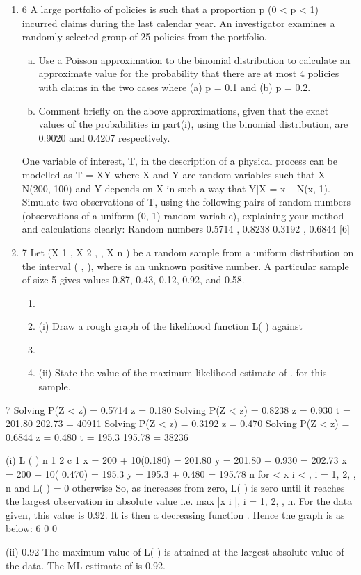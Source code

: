 \documentclass[a4paper,12pt]{article}
\begin{document}
\begin{enumerate}

\item 6
A large portfolio of policies is such that a proportion p (0 < p < 1) incurred claims
during the last calendar year. An investigator examines a randomly selected group of
25 policies from the portfolio.

\begin{enumerate}[(a)]
\item Use a Poisson approximation to the binomial distribution to calculate an
approximate value for the probability that there are at most 4 policies with
claims in the two cases where (a) p = 0.1 and (b) p = 0.2.
\item Comment briefly on the above approximations, given that the exact values of
the probabilities in part(i), using the binomial distribution, are 0.9020 and
0.4207 respectively.
\end{enumerate}

One variable of interest, T, in the description of a physical process can be modelled as
T = XY where X and Y are random variables such that X ~ N(200, 100) and Y depends
on X in such a way that Y|X = x ~ N(x, 1).
Simulate two observations of T, using the following pairs of random numbers
(observations of a uniform (0, 1) random variable), explaining your method and
calculations clearly:
Random numbers
0.5714 , 0.8238
0.3192 , 0.6844
[6]
\item 7
Let (X 1 , X 2 , , X n ) be a random sample from a uniform distribution on the interval
( , ), where is an unknown positive number.
A particular sample of size 5 gives values 0.87, 0.43, 0.12, 0.92, and 0.58.
\begin{enumerate}
\item \item (i) Draw a rough graph of the likelihood function L( ) against
\item \item (ii) State the value of the maximum likelihood estimate of . for this sample.
\end{enumerate}
\end{enumerate}




7
Solving P(Z < z) = 0.5714 z = 0.180
Solving P(Z < z) = 0.8238 z = 0.930
t = 201.80 202.73 = 40911
Solving P(Z < z) = 0.3192 z = 0.470
Solving P(Z < z) = 0.6844 z = 0.480
t = 195.3 195.78 = 38236
\item (i)
L ( )
n
1
2
c
1
x = 200 + 10(0.180) = 201.80
y = 201.80 + 0.930 = 202.73
x = 200 + 10( 0.470) = 195.3
y = 195.3 + 0.480 = 195.78
n
for
< x i < , i = 1, 2,
, n and L( ) = 0 otherwise
So, as increases from zero, L( ) is zero until it reaches the largest
observation in absolute value i.e. max |x i |, i = 1, 2, , n. For the data given,
this value is 0.92.
It is then a decreasing function . Hence the graph is as below:
6
0
0
\item (ii)
0.92
The maximum value of L( ) is attained at the largest absolute value of the
data. The ML estimate of is 0.92.
\end{document}
